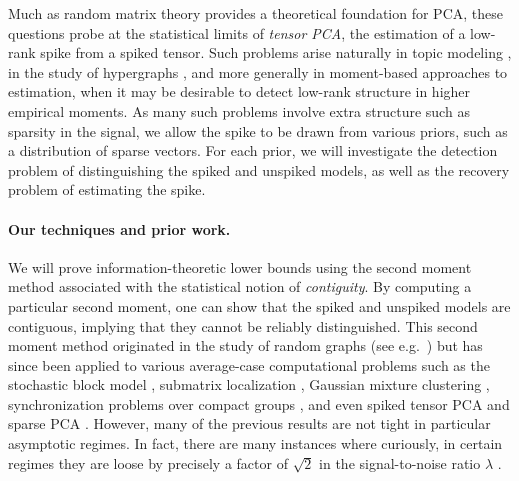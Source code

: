 \documentclass{article}
\begin{document}
Much as random matrix theory provides a theoretical foundation for PCA, these questions probe at the statistical limits of \emph{tensor PCA}, the estimation of a low-rank spike from a spiked tensor. Such problems arise naturally in topic modeling \cite{anandkumar2014tensor}, in the study of hypergraphs \cite{duchenne2011tensor}, and more generally in moment-based approaches to estimation, when it may be desirable to detect low-rank structure in higher empirical moments. As many such problems involve extra structure such as sparsity in the signal, we allow the spike to be drawn from various priors, such as a distribution of sparse vectors. For each prior, we will investigate the detection problem of distinguishing the spiked and unspiked models, as well as the recovery problem of estimating the spike.


\paragraph{Our techniques and prior work.}



We will prove information-theoretic lower bounds using the second moment method associated with the statistical notion of \emph{contiguity}. By computing a particular second moment, one can show that the spiked and unspiked models are contiguous, implying that they cannot be reliably distinguished. This second moment method originated in the study of random graphs (see e.g.\ \cite{wor-survey,rw-ham,janson,1-fact}) but has since been applied to various average-case computational problems such as the stochastic block model \cite{mns,bmnn}, submatrix localization \cite{bmvvx}, Gaussian mixture clustering \cite{bmvvx}, synchronization problems over compact groups \cite{pwbm}, and even spiked tensor PCA \cite{mrz} and sparse PCA \cite{bmvvx}. However, many of the previous results are not tight in particular asymptotic regimes. In fact, there are many instances where curiously, in certain regimes they are loose by precisely a factor of $\sqrt{2}$ in the signal-to-noise ratio $\lambda$ \cite{mrz,bmnn,bmvx,pwbm}.
\end{document}
